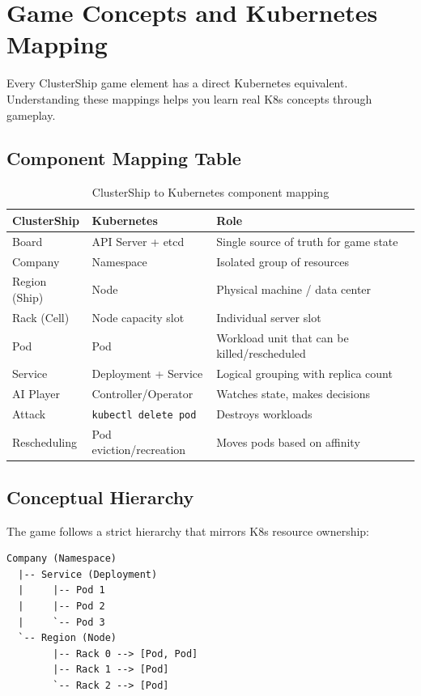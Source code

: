 \documentclass[11pt]{article}
\begin{document}
\section{Game Concepts and Kubernetes Mapping}


Every ClusterShip game element has a direct Kubernetes equivalent. Understanding these mappings helps you learn real K8s concepts through gameplay.

\subsection{Component Mapping Table}

\begin{table}[H]
\centering
\begin{tabular}{@{}lll@{}}
\toprule
\textbf{ClusterShip} & \textbf{Kubernetes} & \textbf{Role} \\
\midrule
Board & API Server + etcd & Single source of truth for game state \\
Company & Namespace & Isolated group of resources \\
Region (Ship) & Node & Physical machine / data center \\
Rack (Cell) & Node capacity slot & Individual server slot \\
Pod & Pod & Workload unit that can be killed/rescheduled \\
Service & Deployment + Service & Logical grouping with replica count \\
AI Player & Controller/Operator & Watches state, makes decisions \\
Attack & \texttt{kubectl delete pod} & Destroys workloads \\
Rescheduling & Pod eviction/recreation & Moves pods based on affinity \\
\bottomrule
\end{tabular}
\caption{ClusterShip to Kubernetes component mapping}
\label{tab:mapping}
\end{table}

\subsection{Conceptual Hierarchy}

The game follows a strict hierarchy that mirrors K8s resource ownership:

\begin{verbatim}
Company (Namespace)
  |-- Service (Deployment)
  |     |-- Pod 1
  |     |-- Pod 2
  |     `-- Pod 3
  `-- Region (Node)
        |-- Rack 0 --> [Pod, Pod]
        |-- Rack 1 --> [Pod]
        `-- Rack 2 --> [Pod]
\end{verbatim}
\end{document}
